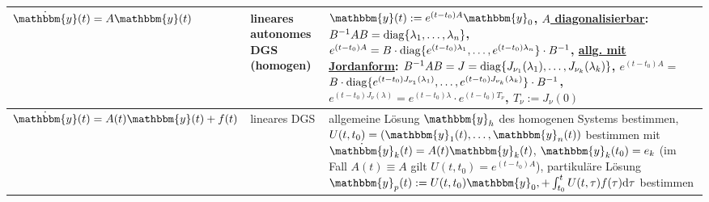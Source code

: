 \begin{landscape}
\begin{tabular}{p{50mm}p{50mm}p{148mm}}
        \midrule

        $\dot{\mathbbm{y}}(t) = A \mathbbm{y}(t)$ &
        lineares autonomes DGS \newline
        (homogen) &
        $\mathbbm{y}(t) := e^{(t - t_0)A} \mathbbm{y}_0$, \newline
        \underline{$A$ diagonalisierbar}:
        $B^{-1} A B = \operatorname{diag}\{\lambda_1, \dotsc, \lambda_n\}$,
        $e^{(t - t_0)A} = B \cdot \operatorname{diag}\{e^{(t - t_0)\lambda_1}, \dotsc,
        e^{(t - t_0)\lambda_n}\} \cdot B^{-1}$, \newline
        \underline{allg. mit Jordanform}:
        $B^{-1} A B = J = \operatorname{diag}\{J_{\nu_1}(\lambda_1), \dotsc,
        J_{\nu_k}(\lambda_k)\}$,
        $e^{(t - t_0)A} =$ \newline
        $B \cdot \operatorname{diag}\{e^{(t - t_0)J_{\nu_1}(\lambda_1)},
        \dotsc, e^{(t - t_0)J_{\nu_k}(\lambda_k)}\} \cdot B^{-1}$,
        $e^{(t - t_0)J_\nu(\lambda)} =
        e^{(t - t_0)\lambda} \cdot e^{(t - t_0)T_\nu}$,
        $T_\nu := J_\nu(0)$ \\

        \midrule

        $\dot{\mathbbm{y}}(t) = A(t) \mathbbm{y}(t) + f(t)$ &
        lineares DGS &
        allgemeine Lösung $\mathbbm{y}_h$ des homogenen Systems bestimmen,
        $U(t, t_0) = (\mathbbm{y}_1(t), \dots, \mathbbm{y}_n(t))$
        bestimmen mit $\dot{\mathbbm{y}}_k(t) = A(t) \mathbbm{y}_k(t)$,
        $\mathbbm{y}_k(t_0) = e_k$
        (im Fall $A(t) \equiv A$ gilt $U(t, t_0) = e^{(t - t_0)A}$), \newline
        partikuläre Lösung $\mathbbm{y}_p(t) := U(t, t_0)\mathbbm{y}_0, +
        \int_{t_0}^t U(t, \tau)f(\tau) \d\tau$ bestimmen \\

        \bottomrule
    \end{tabular}
\end{landscape}

\pagebreak
